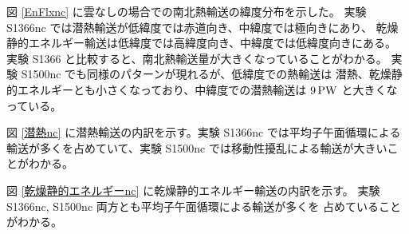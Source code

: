 \documentclass[body]{subfiles}
\begin{document}
\afterpage{\clearpage}

図 \ref{EnFlxnc} に雲なしの場合での南北熱輸送の緯度分布を示した。
実験 S1366nc では潜熱輸送が低緯度では赤道向き、中緯度では極向きにあり、
乾燥静的エネルギー輸送は低緯度では高緯度向き、中緯度では低緯度向きにある。
実験 S1366 と比較すると、南北熱輸送量が大きくなっていることがわかる。
実験 S1500nc でも同様のパターンが現れるが、低緯度での熱輸送は
潜熱、乾燥静的エネルギーとも小さくなっており、中緯度での潜熱輸送は
\(9\hmu{PW}\) と大きくなっている。

図 \ref{潜熱nc} に潜熱輸送の内訳を示す。実験 S1366nc では平均子午面循環による
輸送が多くを占めていて、実験 S1500nc では移動性擾乱による輸送が大きいことがわかる。

図 \ref{乾燥静的エネルギーnc} に乾燥静的エネルギー輸送の内訳を示す。
実験 S1366nc, S1500nc 両方とも平均子午面循環による輸送が多くを
占めていることがわかる。
\end{document}
